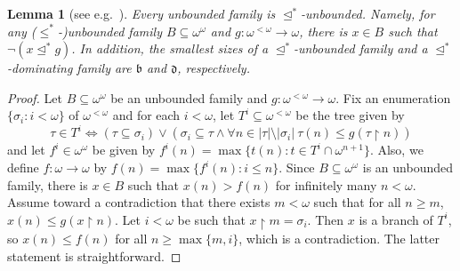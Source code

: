 \documentclass[a4paper,12pt]{amsart}
\newtheorem{lem}[thm]{Lemma}
\theoremstyle{definition}
\numberwithin{thm}{section}
\numberwithin{equation}{section}
\newcommand{\oo}{{\omega}^\omega}
\newcommand{\fsq}{\omega^{<\omega}}
\newcommand{\on}{\mathpunct{\upharpoonright}}
\newcommand{\bb}{\mathfrak{b}}
\newcommand{\dd}{\mathfrak{d}}
\newcommand{\sbd}{\trianglelefteq^*}
\renewcommand{\subset}{\subseteq}
\begin{document}
    \begin{lem}[see e.g.\ {\cite[Table 1, Page 463]{Bla10}}]\label{lem:seq_unbounded}
	   Every unbounded family is $\sbd$-unbounded. Namely, for any ($\leq^*$-)unbounded family $B\subseteq\oo$ and $g\colon \fsq\to\omega$, there is $x\in B$ such that $\lnot(x\sbd g)$. In addition, the smallest sizes of a $\sbd$-unbounded family and a $\sbd$-dominating family are $\bb$ and $\dd$, respectively.
    \end{lem}
    \begin{proof}
        Let $B\subset\omega^\omega$ be an unbounded family and $g\colon\omega^{<\omega}\to\omega$. Fix an enumeration $\{\sigma_i:i<\omega\}$ of $\omega^{<\omega}$ and for each $i<\omega$, let $T^i\subseteq\omega^{<\omega}$ be the tree given by
        \[
        \tau\in T^i \iff (\tau\subset\sigma_i)\lor(\sigma_i\subset\tau\land\forall n \in \lvert\tau\rvert \setminus \lvert\sigma_i\rvert~\tau(n)\leq g(\tau\upharpoonright n))
        \]
    	and let $f^i\in\omega^\omega$ be given by $f^i(n) = \max\{t(n):t\in T^i\cap\omega^{n+1}\}$. Also, we define $f\colon\omega\to\omega$ by $f(n) = \max\{f^i(n):i\leq n\}$. Since $B\subseteq\oo$ is an unbounded family, there is $x\in B$ such that $x(n)>f(n)$ for infinitely many $n<\omega$. Assume toward a contradiction that there exists $m<\omega$ such that for all $n\geq m$, $x(n)\leq g(x\on n)$. Let $i<\omega$ be such that $x\on m=\sigma_i$. Then $x$ is a branch of $T^i$, so $x(n)\leq f(n)$ for all $n\geq \max\{m,i\}$, which is a contradiction. The latter statement is straightforward.
    \end{proof}
    
\end{document}
